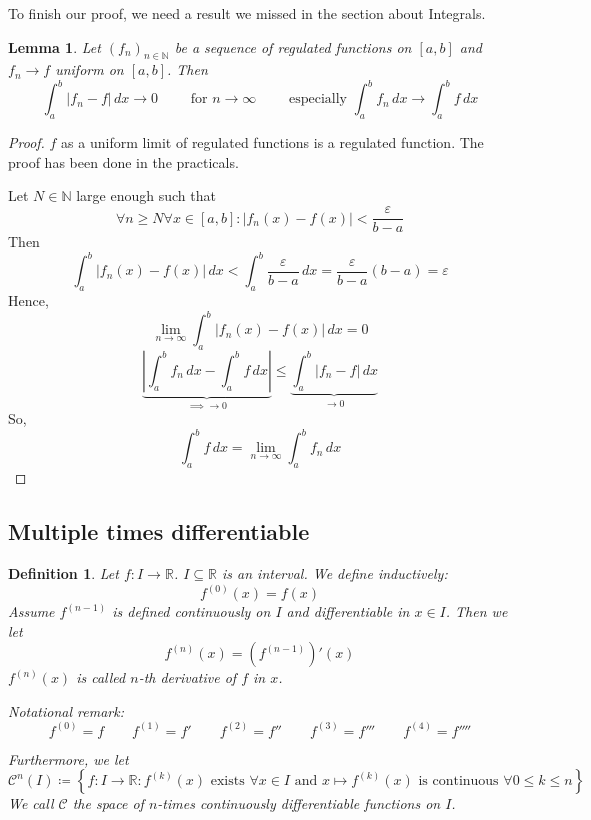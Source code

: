 \documentclass{article}
\newtheorem{definition}{Definition}  \numberwithin{definition}{section}
\newtheorem{lemma}{Lemma}  \numberwithin{lemma}{section}
\newcommand{\set}[1]{\left\{#1\right\}}
\newcommand{\card}[1]{\left|#1\right|}
\begin{document}
To finish our proof, we need a result we missed in the section about Integrals.

\begin{lemma}
  Let $(f_n)_{n \in \mathbb N}$ be a sequence of regulated functions on $[a,b]$ and
  $f_n \to f$ uniform on $[a,b]$. Then
  \[ \int_a^b \card{f_n - f} \, dx \to 0 \qquad \text{ for } n \to \infty \qquad \text{ especially } \int_a^b f_n \, dx \to \int_a^b f \, dx \]
\end{lemma}

\begin{proof}
  $f$ as a uniform limit of regulated functions is a regulated function.
  The proof has been done in the practicals.

  Let $N \in \mathbb N$ large enough such that
  \[ \forall n \geq N \forall x \in [a,b]: \card{f_n(x) - f(x)} < \frac{\varepsilon}{b - a} \]
  Then
  \[ \int_a^b \card{f_n(x) - f(x)} \, dx < \int_a^b \frac{\varepsilon}{b - a} \, dx = \frac{\varepsilon}{b - a} (b - a) = \varepsilon \]
  Hence,
  \[ \lim_{n\to\infty} \int_a^b \card{f_n(x) - f(x)} \, dx = 0 \]
  \[ \underbrace{\card{\int_a^b f_n \, dx - \int_a^b f \, dx}}_{\implies \to 0 } \leq \underbrace{\int_a^b \card{f_n - f} \, dx}_{\to 0} \]
  So,
  \[ \int_a^b f \, dx = \lim_{n\to\infty} \int_a^b f_n \, dx \]
\end{proof}

\subsection{Multiple times differentiable}

\begin{definition} %
  Let $f: I \to \mathbb R$. $I \subseteq \mathbb R$ is an interval.
  We define inductively:
  \[ f^{(0)}(x) = f(x) \]
  Assume $f^{(n-1)}$ is defined continuously on $I$ and differentiable in $x \in I$.
  Then we let
  \[ f^{(n)}(x) = \left(f^{(n-1)}\right)'(x) \]
  $f^{(n)}(x)$ is called $n$-th derivative of $f$ in $x$.
  
  Notational remark:
  \[ f^{(0)} = f \qquad f^{(1)} = f' \qquad f^{(2)} = f'' \qquad f^{(3)} = f''' \qquad f^{(4)} = f'''' \]

  Furthermore, we let
  \[ \mathcal C^n(I) \coloneqq \set{f: I \to \mathbb R: f^{(k)}(x) \text{ exists } \forall x \in I \text{ and } x \mapsto f^{(k)}(x) \text{ is continuous } \forall 0 \leq k \leq n} \]
  We call $\mathcal C$ the space of $n$-times continuously differentiable functions on $I$.
\end{definition}
\end{document}
